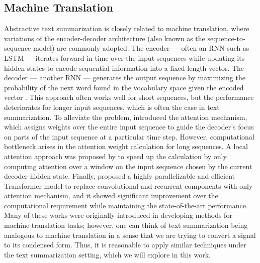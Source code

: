 \subsection{Machine Translation}
Abstractive text summarization is closely related to machine translation, where variations of the encoder-decoder architecture (also known as the sequence-to-sequence model) are commonly adopted. The encoder --- often an RNN such as LSTM --- iterates forward in time over the input sequences while updating its hidden states to encode sequential information into a fixed-length vector. The decoder --- another RNN --- generates the output sequence by maximizing the probability of the next word found in the vocabulary space given the encoded vector \cite{sutskever2014sequence,cho2014learning}. This approach often works well for short sequences, but the performance deteriorates for longer input sequences, which is often the case in text summarization. To alleviate the problem, \cite{bahdanau2014neural} introduced the attention mechanism, which assigns weights over the entire input sequence to guide the decoder's focus on parts of the input sequence at a particular time step. However, computational bottleneck arises in the attention weight calculation for long sequences. A local attention approach was proposed by \cite{luong2015effective} to speed up the calculation by only computing attention over a window on the input sequence chosen by the current decoder hidden state. Finally, \cite{vaswani2017attention} proposed a highly parallelizable and efficient Transformer model to replace convolutional and recurrent components with only attention mechanism, and it showed significant improvement over the computational requirement while maintaining the state-of-the-art performance. Many of these works were originally introduced in developing methods for machine translation tasks; however, one can think of text summarization being analogous to machine translation in a sense that we are trying to convert a signal to its condensed form. Thus, it is reasonable to apply similar techniques under the text summarization setting, which we will explore in this work.

